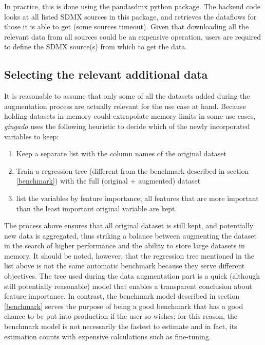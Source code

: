 \documentclass{article}
\begin{document}
In practice, this is done using the pandasdmx python package. The backend code looks at all listed SDMX sources in this package, and retrieves the dataflows for those it is able to get (some sources timeout). Given that downloading all the relevant data from all sources could be an expensive operation, users are required to define the SDMX source(s) from which to get the data.

\subsection{Selecting the relevant additional data}
It is reasonable to assume that only some of all the datasets added during the augmentation process are actually relevant for the use case at hand. Because holding datasets in memory could extrapolate memory limits in some use cases, \textit{gingado} uses the following heuristic to decide which of the newly incorporated variables to keep:

\begin{enumerate}
    \item Keep a separate list with the column names of the original dataset
    \item Train a regression tree (different from the benchmark described in section \ref{benchmark}) with the full (original + augmented) dataset
    \item list the variables by feature importance; all features that are more important than the least important original variable are kept.
\end{enumerate}

The process above ensures that all original dataset is still kept, and potentially new data is aggregated, thus striking a balance between augmenting the dataset in the search of higher performance and the ability to store large datasets in memory. It should be noted, however, that the regression tree mentioned in the list above is not the same automatic benchmark because they serve different objectives. The tree used during the data augmentation part is a quick (although still potentially reasonable) model that enables a transparent conclusion about feature importance. In contrast, the benchmark model described in section \ref{benchmark} serves the purpose of being a good benchmark that has a good chance to be put into production if the user so wishes; for this reason, the benchmark model is not necessarily the fastest to estimate and in fact, its estimation counts with expensive calculations such as fine-tuning.
\end{document}
